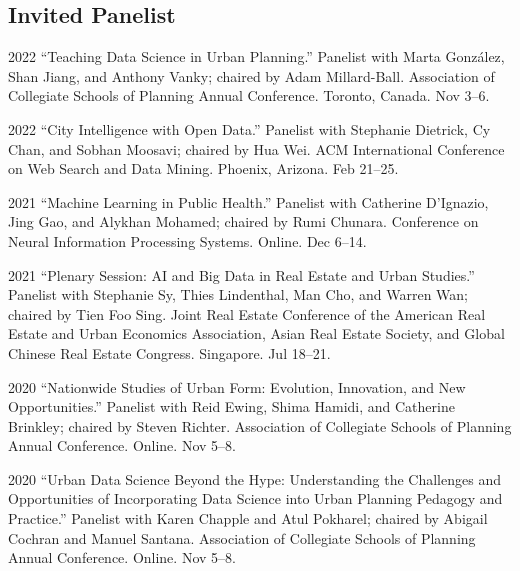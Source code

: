 \documentclass[12pt,letterpaper]{report}
\begin{document}
    \subsection*{Invited Panelist}

    \begin{tablist}    	
    	
    	\item[2022] \tab{}\enquote{Teaching Data Science in Urban Planning.} Panelist with Marta Gonz{\'a}lez, Shan Jiang, and Anthony Vanky; chaired by Adam Millard-Ball. Association of Collegiate Schools of Planning Annual Conference. Toronto, Canada. Nov 3--6.

        \item[2022] \tab{}\enquote{City Intelligence with Open Data.} Panelist with Stephanie Dietrick, Cy Chan, and Sobhan Moosavi; chaired by Hua Wei. ACM International Conference on Web Search and Data Mining. Phoenix, Arizona. Feb 21--25.

        \item[2021] \tab{}\enquote{Machine Learning in Public Health.} Panelist with Catherine D'Ignazio, Jing Gao, and Alykhan Mohamed; chaired by Rumi Chunara. Conference on Neural Information Processing Systems. Online. Dec 6--14.

        \item[2021] \tab{}\enquote{Plenary Session: AI and Big Data in Real Estate and Urban Studies.} Panelist with Stephanie Sy, Thies Lindenthal, Man Cho, and Warren Wan; chaired by Tien Foo Sing. Joint Real Estate Conference of the American Real Estate and Urban Economics Association, Asian Real Estate Society, and Global Chinese Real Estate Congress. Singapore. Jul 18--21.

        \item[2020] \tab{}\enquote{Nationwide Studies of Urban Form: Evolution, Innovation, and New Opportunities.} Panelist with Reid Ewing, Shima Hamidi, and Catherine Brinkley; chaired by Steven Richter. Association of Collegiate Schools of Planning Annual Conference. Online. Nov 5--8.

        \item[2020] \tab{}\enquote{Urban Data Science Beyond the Hype: Understanding the Challenges and Opportunities of Incorporating Data Science into Urban Planning Pedagogy and Practice.} Panelist with Karen Chapple and Atul Pokharel; chaired by Abigail Cochran and Manuel Santana. Association of Collegiate Schools of Planning Annual Conference. Online. Nov 5--8.


\end{tablist}
\end{document}
